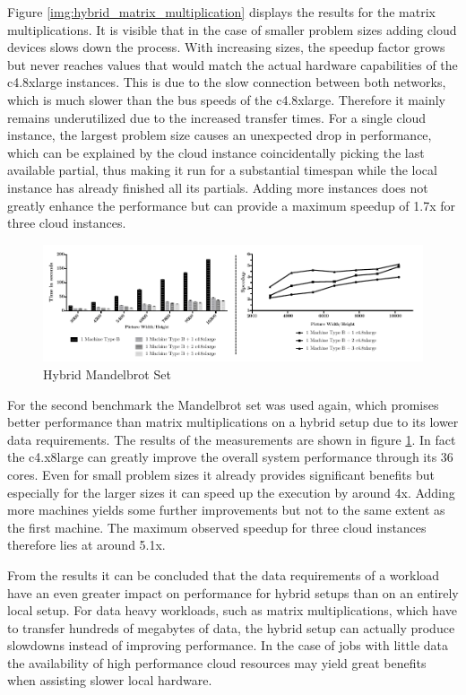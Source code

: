 Figure \ref{img:hybrid_matrix_multiplication} displays the results for the matrix multiplications. It is visible that in the case of smaller problem sizes adding cloud devices slows down the process. With increasing sizes, the speedup factor grows but never reaches values that would match the actual hardware capabilities of the c4.8xlarge instances. This is due to the slow connection between both networks, which is much slower than the bus speeds of the c4.8xlarge. Therefore it mainly remains underutilized due to the increased transfer times. For a single cloud instance, the largest problem size causes an unexpected drop in performance, which can be explained by the cloud instance coincidentally picking the last available partial, thus making it run for a substantial timespan while the local instance has already finished all its partials. Adding more instances does not greatly enhance the performance but can provide a maximum speedup of 1.7x for three cloud instances.


\begin{figure}[!htb]
	\includegraphics[width=1.0\textwidth]{images/hybrid_mandelbrot_performance.pdf}
	\centering
	\caption{Hybrid Mandelbrot Set}
	\label{img:hybrid_mandelbrot}
\end{figure}

For the second benchmark the Mandelbrot set was used again, which promises better performance than matrix multiplications on a hybrid setup due to its lower data requirements. The results of the measurements are shown in figure \ref{img:hybrid_mandelbrot}. In fact the c4.x8large can greatly improve the overall system performance through its 36 cores. Even for small problem sizes it already provides significant benefits but especially for the larger sizes it can speed up the execution by around 4x. Adding more machines yields some further improvements but not to the same extent as the first machine. The maximum observed speedup for three cloud instances therefore lies at around 5.1x.

From the results it can be concluded that the data requirements of a workload have an even greater impact on performance for hybrid setups than on an entirely local setup. For data heavy workloads, such as matrix multiplications, which have to transfer hundreds of megabytes of data, the hybrid setup can actually produce slowdowns instead of improving performance. In the case of jobs with little data the availability of high performance cloud resources may yield great benefits when assisting slower local hardware.

